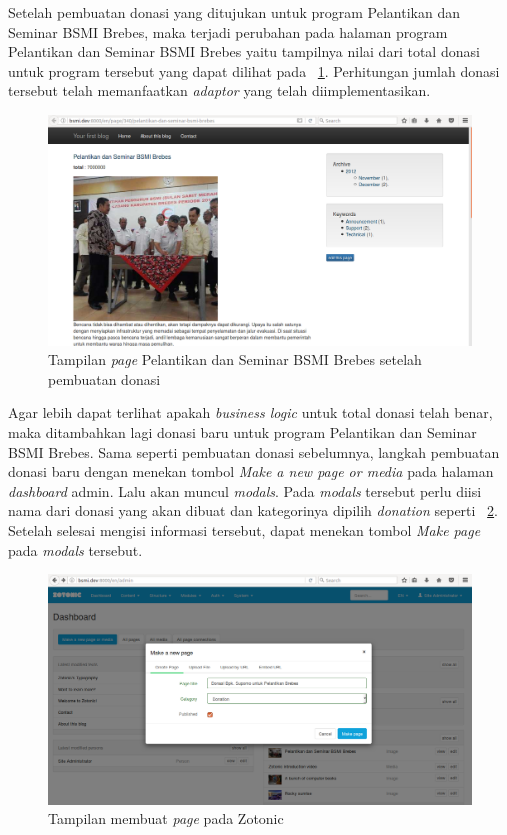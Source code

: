 Setelah pembuatan donasi yang ditujukan untuk program Pelantikan dan Seminar BSMI Brebes, maka terjadi perubahan pada halaman program Pelantikan dan Seminar BSMI Brebes yaitu tampilnya nilai dari total donasi untuk program tersebut yang dapat dilihat pada \pic~\ref{fig:viewprogram2}. Perhitungan jumlah donasi tersebut telah memanfaatkan \textit{adaptor} yang telah diimplementasikan.
\begin{figure}
	\centering
	\includegraphics[width=1\textwidth]
	{pics/12-viewprogram.png}
	\caption{Tampilan \textit{page} Pelantikan dan Seminar BSMI Brebes setelah pembuatan donasi}
	\label{fig:viewprogram2}
\end{figure}
\vspace{-0.3cm}

Agar lebih dapat terlihat apakah \textit{business logic} untuk total donasi telah benar, maka ditambahkan lagi donasi baru untuk program Pelantikan dan Seminar BSMI Brebes. Sama seperti pembuatan donasi sebelumnya, langkah pembuatan donasi baru dengan menekan tombol \textit{Make a new page or media} pada halaman \textit{dashboard} admin. Lalu akan muncul \textit{modals}. Pada \textit{modals} tersebut perlu diisi nama dari donasi yang akan dibuat dan kategorinya dipilih \textit{donation} seperti \pic~\ref{fig:createdonation2}. Setelah selesai mengisi informasi tersebut, dapat menekan tombol \textit{Make page} pada \textit{modals} tersebut.
\begin{figure}
	\centering
	\includegraphics[width=1\textwidth]
	{pics/13-createDonation2.png}
	\caption{Tampilan membuat \textit{page} pada Zotonic}
	\label{fig:createdonation2}
\end{figure}
\vspace{-0.3cm}


